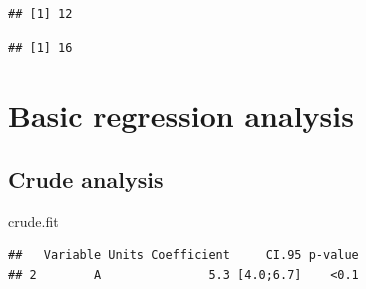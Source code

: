 \documentclass[
]{book}
\newenvironment{Shaded}{\begin{snugshade}}{\end{snugshade}}
\newcommand{\AttributeTok}[1]{\textcolor[rgb]{0.77,0.63,0.00}{#1}}
\newcommand{\CommentTok}[1]{\textcolor[rgb]{0.56,0.35,0.01}{\textit{#1}}}
\newcommand{\DecValTok}[1]{\textcolor[rgb]{0.00,0.00,0.81}{#1}}
\newcommand{\FunctionTok}[1]{\textcolor[rgb]{0.00,0.00,0.00}{#1}}
\newcommand{\NormalTok}[1]{#1}
\newcommand{\OtherTok}[1]{\textcolor[rgb]{0.56,0.35,0.01}{#1}}
\newcommand{\SpecialCharTok}[1]{\textcolor[rgb]{0.00,0.00,0.00}{#1}}
\begin{document}
\begin{Shaded}
\end{Shaded}

\begin{verbatim}
## [1] 12
\end{verbatim}

\begin{verbatim}
## [1] 16
\end{verbatim}

\hypertarget{basic-regression-analysis}{%
\section{Basic regression analysis}\label{basic-regression-analysis}}

\hypertarget{crude-analysis}{%
\subsection{Crude analysis}\label{crude-analysis}}

\begin{Shaded}
\end{Shaded}

\begin{Shaded}
\begin{Highlighting}[]
\NormalTok{crude.fit}
\end{Highlighting}
\end{Shaded}

\begin{verbatim}
##   Variable Units Coefficient     CI.95 p-value
## 2        A               5.3 [4.0;6.7]    <0.1
\end{verbatim}
\end{document}
